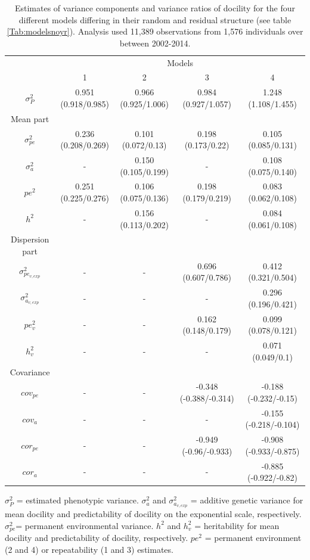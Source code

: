 \documentclass[a4paper,12pt,twoside]{article}
\begin{document}
	\begin{table}[h!]
		\caption{Estimates of variance components and variance ratios of docility for the four different models differing in their random and residual structure (see table \ref{Tab:modelsnoyr}). 
			Analysis used 11,389 observations from 1,576 individuals over between 2002-2014.}
		\label{Tab:estimatesnoyr}
		\centering
		\small
		\begin{tabular}{c c c c c}
			\hline
			\multicolumn{1}{c}{} &
			\multicolumn{4}{c}{Models}\\
			& 1 & 2 & 3 & 4\\
			\hline
			$\sigma_P^2$ & 0.951 (0.918/0.985) & 0.966 (0.925/1.006) & 0.984 (0.927/1.057) & 1.248 (1.108/1.455)\\
			Mean part & & & &\\
			$\sigma_{pe}^2$ & 0.236 (0.208/0.269) & 0.101 (0.072/0.13) & 0.198 (0.173/0.22) & 0.105 (0.085/0.131)\\
			$\sigma_{a}^2$ & - & 0.150 (0.105/0.199) & - & 0.108 (0.075/0.140) \\
			$pe^2$ & 0.251 (0.225/0.276) & 0.106 (0.075/0.136) & 0.198 (0.179/0.219) & 0.083 (0.062/0.108)\\
			$h^2$ & - & 0.156 (0.113/0.202) & - & 0.084 (0.061/0.108)\\
			Dispersion part & & & &\\
			$\sigma_{pe_{v, exp}}^2$ & - & - & 0.696 (0.607/0.786) & 0.412 (0.321/0.504)\\
			$\sigma_{a_{v, exp}}^2$ & - & - & - & 0.296 (0.196/0.421)\\
			$pe_v^2$ & - & - & 0.162 (0.148/0.179) & 0.099 (0.078/0.121)\\
			$h_v^2$ & - & - & - & 0.071 (0.049/0.1)\\
			Covariance & & & &\\
			$cov_{pe}$ & - & - & -0.348 (-0.388/-0.314) & -0.188 (-0.232/-0.15)\\
			$cov_{a}$ & - & - & - & -0.155 (-0.218/-0.104)\\
			$cor_{pe}$ & - & - & -0.949 (-0.96/-0.933) & -0.908 (-0.933/-0.875)\\
			$cor_{a}$ & - & - & - & -0.885 (-0.922/-0.82)\\
			\hline
		\end{tabular}
		\begin{tablenotes}
			\small
			\item $\sigma_P^2$ = estimated phenotypic variance. 
			$\sigma_a^2$ and $\sigma_{a_{v, exp}}^2$ = additive genetic variance for mean docility and predictability of docility on the exponential scale, respectively. 
			$\sigma_{pe}^2$= permanent environmental variance. 
			$h^2$ and $h_v^2$ = heritability for mean docility and predictability of docility, respectively. 
			$pe^2$ = permanent environment (2 and 4) or repeatability (1 and 3) estimates.
		\end{tablenotes}
	\end{table}
	
\end{document}
